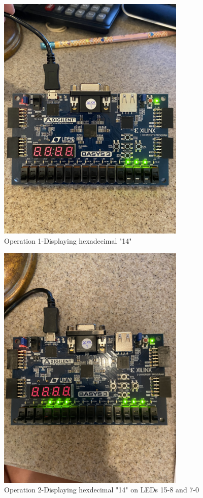 \documentclass[11pt]{article}
\begin{document}
\begin{figure}[ht]\centering
	\includegraphics[angle=270, width=0.8\textwidth]{step1.jpg}
	\caption{Operation 1-Displaying hexadecimal "14"}
	\label{fig:sim_with_table}
\end{figure}
\clearpage

\begin{figure}[ht]\centering
	\includegraphics[angle=270, width=0.8\textwidth]{step2.jpg}
	\caption{Operation 2-Displaying hexdecimal "14" on LEDs 15-8 and 7-0}
	\label{fig:sim_with_table}
\end{figure}
\clearpage
\end{document}
